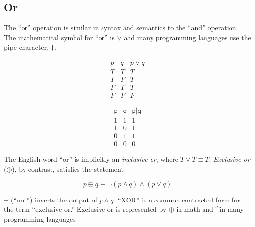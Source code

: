 \documentclass{book}
\begin{document}
\subsection{Or}

The ``or'' operation is similar in syntax and semantics to the ``and'' operation. The mathematical symbol for ``or'' is $\vee$ and many programming languages use the pipe character, \texttt{|}.

\begin{multicols}{2}

\begin{equation*}
\begin{array}{c|c|c}
p & q & p \vee q \\
\hline
T & T & T \\
T & F & T \\
F & T & T \\
F & F & F
\end{array}
\end{equation*}

\begin{equation*}
\begin{array}{c|c|c}
\texttt{p} & \texttt{q} & \texttt{p|q} \\
\hline
1 & 1 & 1 \\
1 & 0 & 1 \\
0 & 1 & 1 \\
0 & 0 & 0
\end{array}
\end{equation*}

\end{multicols}

The English word ``or'' is implicitly an \textit{inclusive or}, where $T \vee T \equiv T$. \textit{Exclusive or} ($\oplus$), by contrast, satisfies the statement

\begin{equation*}
p \oplus q \equiv \neg (p \wedge q) \wedge (p\vee q)
\end{equation*}

$\neg$ (``not'') inverts the output of $p \wedge q$. ``XOR'' is a common contracted form for the term ``exclusive or.'' Exclusive or is represented by $\oplus$ in math and \textasciicircum in many programming languages.
\end{document}
